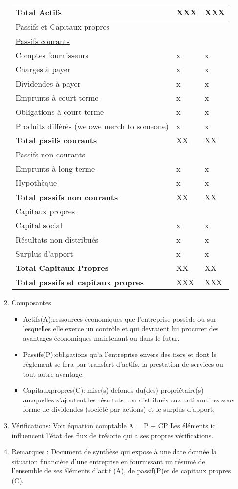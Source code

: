 \documentclass[11pt]{article}
\begin{document}
\begin{enumerate}
\begin{enumerate}
\begin{center}
\begin{tabular}{lll}
\hline
\textbf{Total Actifs} & XXX & XXX\\
\hline
Passifs et Capitaux propres &  & \\
\hline
\uline{Passifs courants} &  & \\
Comptes fournisseurs & x & x\\
Charges à payer & x & x\\
Dividendes à payer & x & x\\
Emprunts à court terme & x & x\\
Obligations à court terme & x & x\\
Produits différés (we owe merch to someone) & x & x\\
\textbf{Total pasifs courants} & XX & XX\\
\hline
\uline{Passifs non courants} &  & \\
Emprunts à long terme & x & x\\
Hypothèque & x & x\\
\textbf{Total passifs non courants} & XX & XX\\
\hline
\uline{Capitaux propres} &  & \\
Capital social & x & x\\
Résultats non distribués & x & x\\
Surplus d'apport & x & x\\
\textbf{Total Capitaux Propres} & XX & XX\\
\hline
\textbf{Total passifs et capitaux propres} & XXX & XXX\\
\hline
\end{tabular}
\end{center}
\item Composantes
\label{sec:org91264f8}
\begin{itemize}
\item Actifs(A):ressources économiques que l’entreprise possède ou sur lesquelles
elle exerce un contrôle et qui devraient lui procurer des avantages
économiques maintenant ou dans le futur.

\item Passifs(P):obligations qu’a l’entreprise envers des tiers et dont le
règlement se fera par transfert d’actifs, la prestation de services ou tout
autre avantage.

\item Capitauxpropres(C): mise(s) defonds du(des) propriétaire(s) auxquelles
s’ajoutent les résultats non distribués aux actionnaires sous forme de
dividendes (société par actions) et le surplus d’apport.
\end{itemize}
\item Vérifications:
\label{sec:orgdee228e}
Voir équation comptable A = P + CP
Les éléments ici influencent l'état des flux de trésorie qui a ses propres vérifications.
\item Remarques :
\label{sec:orga8bcced}
Document de synthèse qui expose à une date donnée la situation financière d'une
entreprise en fournissant un résumé de l'ensemble de ses éléments d'actif (A),
de passif(P)et de capitaux propres (C).


\end{enumerate}
\end{enumerate}
\end{document}
